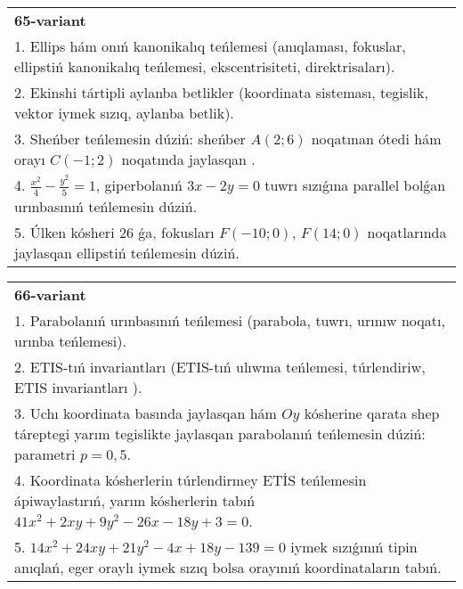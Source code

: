 \documentclass{article}
\begin{document}
\begin{tabular}{m{17cm}}
\textbf{65-variant}\\
1. Ellips hám onıń kanonikalıq teńlemesi (anıqlaması, fokuslar, ellipstiń kanonikalıq teńlemesi, ekscentrisiteti, direktrisaları).\\

2. Ekinshi tártipli aylanba betlikler (koordinata sisteması, tegislik, vektor iymek sızıq, aylanba betlik).\\

3. Sheńber teńlemesin dúziń: sheńber $A (2;6 ) $ noqatınan ótedi hám orayı $C (-1;2) $ noqatında jaylasqan .\\

4. $\frac{x^{2}}{4} - \frac{y^{2}}{5} = 1$, giperbolanıń $3x - 2y = 0$ tuwrı sızıǵına parallel bolǵan urınbasınıń teńlemesin dúziń.  \\

5. Úlken kósheri 26 ǵa, fokusları $F( - 10;0)$, $F(14;0)$ noqatlarında jaylasqan ellipstiń teńlemesin dúziń.  
\end{tabular}
\vspace{1cm}


\begin{tabular}{m{17cm}}
\textbf{66-variant}\\
1. Parabolanıń urınbasınıń teńlemesi (parabola, tuwrı, urınıw noqatı, urınba teńlemesi).\\

2. ETIS-tıń invariantları (ETIS-tıń ulıwma teńlemesi, túrlendiriw, ETIS invariantları ).\\

3. Uchı koordinata basında jaylasqan hám $Oy$ kósherine qarata shep táreptegi yarım tegislikte jaylasqan parabolanıń teńlemesin dúziń: parametri $p=0,5$.\\

4. Koordinata kósherlerin túrlendirmey ETİS teńlemesin ápiwaylastırıń, yarım kósherlerin tabıń $41x^{2} + 2xy + 9y^{2} - 26x - 18y + 3 = 0$.  \\

5. $14x^{2} + 24xy + 21y^{2} - 4x + 18y - 139 = 0$ iymek sızıǵınıń tipin anıqlań, eger oraylı iymek sızıq bolsa orayınıń koordinataların tabıń.  
\end{tabular}
\vspace{1cm}
\end{document}
